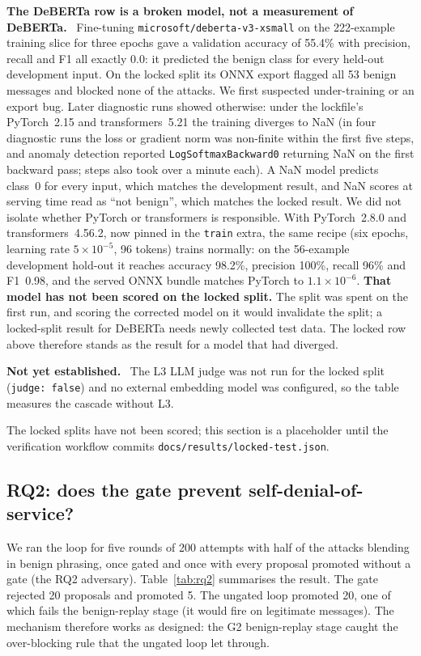 \documentclass[11pt,a4paper]{article}
\newcommand{\sidebar}[1]{\par\smallskip\noindent\textbf{#1}\ }
\begin{document}
{\sidebar{The DeBERTa row is a broken model, not a measurement of DeBERTa.} Fine-tuning
\texttt{microsoft/deberta-v3-xsmall} on the 222-example training slice for three epochs gave a
validation accuracy of 55.4\% with precision, recall and F1 all exactly 0.0: it predicted the benign
class for every held-out development input. On the locked split its ONNX export flagged all 53
benign messages and blocked none of the attacks. We first suspected under-training or an export bug.
Later diagnostic runs showed otherwise: under the lockfile's PyTorch~2.15 and transformers~5.21 the
training diverges to NaN (in four diagnostic runs the loss or gradient norm was non-finite within the
first five steps, and anomaly detection reported \texttt{LogSoftmaxBackward0} returning NaN on the first
backward pass; steps also took over a minute each). A NaN model predicts class~0 for
every input, which matches the development result, and NaN scores at serving time read as
``not benign'', which matches the locked result. We did not isolate whether PyTorch or transformers
is responsible. With PyTorch~2.8.0 and transformers~4.56.2, now pinned in the \texttt{train} extra,
the same recipe (six epochs, learning rate $5\times10^{-5}$, 96 tokens) trains normally: on the
56-example development hold-out it reaches accuracy 98.2\%, precision 100\%, recall 96\% and F1~0.98,
and the served ONNX bundle matches PyTorch to $1.1\times10^{-6}$. \textbf{That model has not been
scored on the locked split.} The split was spent on the first run, and scoring the corrected model
on it would invalidate the split; a locked-split result for DeBERTa needs newly collected test data.
The locked row above therefore stands as the result for a model that had diverged.

\sidebar{Not yet established.} The L3 LLM judge was not run for the locked split (\texttt{judge:
false}) and no external embedding model was configured, so the table measures the cascade without L3.
}{%
The locked splits have not been scored; this section is a placeholder until the verification
workflow commits \texttt{docs/results/locked-test.json}.}

\subsection{RQ2: does the gate prevent self-denial-of-service?}
We ran the loop for five rounds of 200 attempts with half of the attacks blending in benign
phrasing, once gated and once with every proposal promoted without a gate (the RQ2 adversary).
Table~\ref{tab:rq2} summarises the result. The gate rejected 20 proposals and promoted 5. The
ungated loop promoted 20, one of which fails the benign-replay stage (it would fire on
legitimate messages). The mechanism therefore works as
designed: the G2 benign-replay stage caught the over-blocking rule that the ungated loop let
through.
\end{document}
